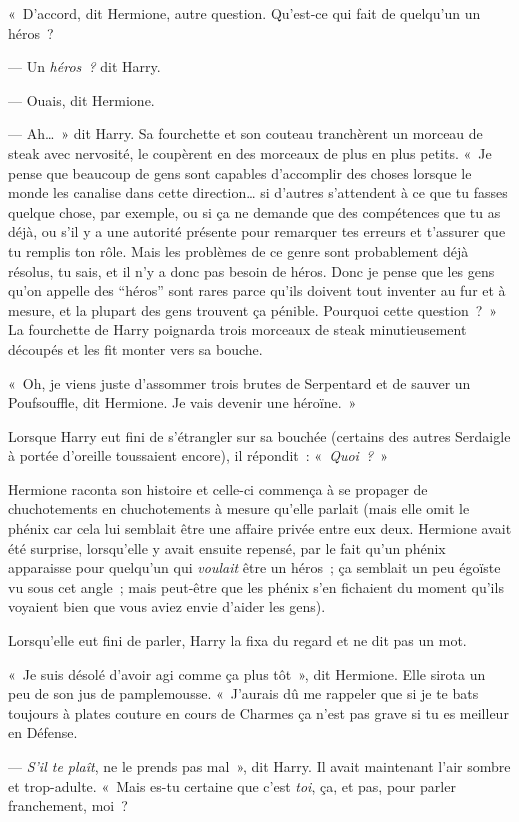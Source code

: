 «~D'accord, dit Hermione, autre question.
Qu'est-ce qui fait de quelqu'un un héros~?

--- Un \emph{héros~?} dit Harry.

--- Ouais, dit Hermione.

--- Ah…~» dit Harry.
Sa fourchette et son couteau tranchèrent un morceau de steak avec nervosité, le coupèrent en des morceaux de plus en plus petits.
«~Je pense que beaucoup de gens sont capables d'accomplir des choses lorsque le monde les canalise dans cette direction… si d'autres s'attendent à ce que tu fasses quelque chose, par exemple, ou si ça ne demande que des compétences que tu as déjà, ou s'il y a une autorité présente pour remarquer tes erreurs et t'assurer que tu remplis ton rôle.
Mais les problèmes de ce genre sont probablement déjà résolus, tu sais, et il n'y a donc pas besoin de héros.
Donc je pense que les gens qu'on appelle des “héros” sont rares parce qu'ils doivent tout inventer au fur et à mesure, et la plupart des gens trouvent ça pénible.
Pourquoi cette question~?~»
La fourchette de Harry poignarda trois morceaux de steak minutieusement découpés et les fit monter vers sa bouche.

«~Oh, je viens juste d'assommer trois brutes de Serpentard et de sauver un Poufsouffle, dit Hermione.
Je vais devenir une héroïne.~»

Lorsque Harry eut fini de s'étrangler sur sa bouchée (certains des autres Serdaigle à portée d'oreille toussaient encore), il répondit~: «~\emph{Quoi~?}~»

Hermione raconta son histoire et celle-ci commença à se propager de chuchotements en chuchotements à mesure qu'elle parlait (mais elle omit le phénix car cela lui semblait être une affaire privée entre eux deux.
Hermione avait été surprise, lorsqu'elle y avait ensuite repensé, par le fait qu'un phénix apparaisse pour quelqu'un qui \emph{voulait} être un héros~; ça semblait un peu égoïste vu sous cet angle~; mais peut-être que les phénix s'en fichaient du moment qu'ils voyaient bien que vous aviez envie d'aider les gens).

Lorsqu'elle eut fini de parler, Harry la fixa du regard et ne dit pas un mot.

«~Je suis désolé d'avoir agi comme ça plus tôt~», dit Hermione.
Elle sirota un peu de son jus de pamplemousse.
«~J'aurais dû me rappeler que si je te bats toujours à plates couture en cours de Charmes ça n'est pas grave si tu es meilleur en Défense.

--- \emph{S'il te plaît}, ne le prends pas mal~», dit Harry.
Il avait maintenant l'air sombre et trop-adulte.
«~Mais es-tu certaine que c'est \emph{toi}, ça, et pas, pour parler franchement, moi~?

